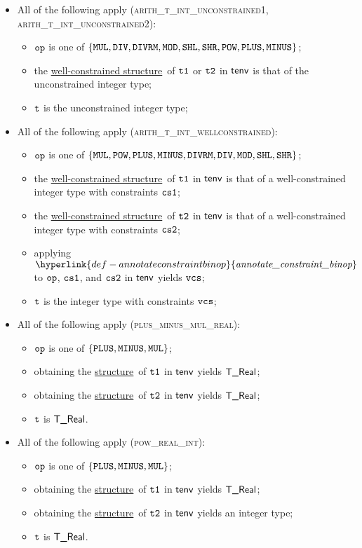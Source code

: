 \documentclass{book}
\newcommand\structure[0]{\hyperlink{def-structure}{structure}}
\newcommand\wellconstrainedstructure[0]{\hyperlink{def-getwellconstrainedstructure}{well-constrained structure}}
\newcommand\annotateconstraintbinop[0]{\hyperlink{def-annotateconstraintbinop}{\textfunc{annotate\_constraint\_binop}}}
\begin{document}
\begin{itemize}
  \item All of the following apply (\textsc{arith\_t\_int\_unconstrained1}, \\
                                    \textsc{arith\_t\_int\_unconstrained2}):
  \begin{itemize}
    \item $\texttt{op}$ is one of $\{\texttt{MUL}, \texttt{DIV}, \texttt{DIVRM}, \texttt{MOD}, \texttt{SHL},  \texttt{SHR}, \texttt{POW}, \texttt{PLUS}, \texttt{MINUS}\}$;
    \item the \wellconstrainedstructure\ of $\texttt{t1}$ or $\texttt{t2}$ in $\textsf{tenv}$ is that of the unconstrained integer type;
    \item $\texttt{t}$ is the unconstrained integer type;
  \end{itemize}

  \item All of the following apply (\textsc{arith\_t\_int\_wellconstrained}):
  \begin{itemize}
    \item $\texttt{op}$ is one of $\{\texttt{MUL}, \texttt{POW}, \texttt{PLUS}, \texttt{MINUS}, \texttt{DIVRM}, \texttt{DIV}, \texttt{MOD}, \texttt{SHL}, \texttt{SHR}\}$;
    \item the \wellconstrainedstructure\ of $\texttt{t1}$ in $\textsf{tenv}$ is that of a well-constrained integer type with
          constraints $\texttt{cs1}$;
    \item the \wellconstrainedstructure\ of $\texttt{t2}$ in $\textsf{tenv}$ is that of a well-constrained integer type with
          constraints $\texttt{cs2}$;
    \item applying $\annotateconstraintbinop$ to $\texttt{op}$, $\texttt{cs1}$, and $\texttt{cs2}$ in $\textsf{tenv}$ yields $\texttt{vcs}$;
    \item $\texttt{t}$ is the integer type with constraints $\texttt{vcs}$;
  \end{itemize}

  \item All of the following apply (\textsc{plus\_minus\_mul\_real}):
  \begin{itemize}
    \item $\texttt{op}$ is one of $\{\texttt{PLUS}, \texttt{MINUS}, \texttt{MUL}\}$;
    \item obtaining the \structure\ of $\texttt{t1}$ in $\textsf{tenv}$ yields $\textsf{T\_Real}$;
    \item obtaining the \structure\ of $\texttt{t2}$ in $\textsf{tenv}$ yields $\textsf{T\_Real}$;
    \item $\texttt{t}$ is $\textsf{T\_Real}$.
  \end{itemize}

  \item All of the following apply (\textsc{pow\_real\_int}):
  \begin{itemize}
    \item $\texttt{op}$ is one of $\{\texttt{PLUS}, \texttt{MINUS}, \texttt{MUL}\}$;
    \item obtaining the \structure\ of $\texttt{t1}$ in $\textsf{tenv}$ yields $\textsf{T\_Real}$;
    \item obtaining the \structure\ of $\texttt{t2}$ in $\textsf{tenv}$ yields an integer type;
    \item $\texttt{t}$ is $\textsf{T\_Real}$.
  \end{itemize}


\end{itemize}
\end{document}
